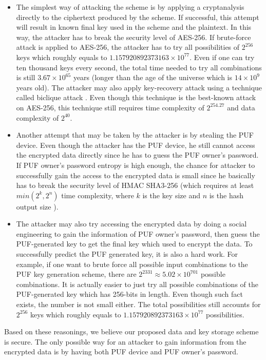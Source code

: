 \begin{itemize}
  \item The simplest way of attacking the scheme is by applying a cryptanalysis directly to the ciphertext produced by the scheme. If successful, this attempt will result in known final key used in the scheme and the plaintext.  In this way, the attacker has to break the security level of AES-256. If brute-force attack is applied to AES-256, the attacker has to try all possibilities of $2^{256}$ keys which roughly equals to $1.157920892373163 \times 10^{77}$. Even if one can try ten thousand keys every second, the total time needed to try all combinations is still $3.67 \times 10^{65}$ years (longer than the age of the universe which is $14 \times 10^9$ years old).
  The attacker may also apply key-recovery attack using a technique called biclique attack \cite{10.1007/978-3-319-19962-7_3}. Even though this technique is the best-known attack on AES-256, this technique still requires time complexity of $2^{254.27}$ and data complexity of $2^{40}$.
  \item Another attempt that may be taken by the attacker is by stealing the PUF device. Even though the attacker has the PUF device, he still cannot access the encrypted data directly since he has to guess the PUF owner's password. If PUF owner's password entropy is high enough, the chance for attacker to successfully gain the access to the encrypted data is small since he basically has to break the security level of HMAC SHA3-256 (which requires at least $min(2^k, 2^n)$ time complexity, where $k$ is the key size and $n$ is the hash output size \cite{hmac_security}).
  \item The attacker may also try accessing the encrypted data by doing a social engineering to gain the information of PUF owner's password, then guess the PUF-generated key to get the final key which used to encrypt the data. To successfully predict the PUF generated key, it is also a hard work. For example, if one want to brute force all possible input combinations to the PUF key generation scheme, there are $2^{2331} \approx 5.02 \times 10^{701}$ possible combinations. It is actually easier to just try all possible combinations of the PUF-generated key which has 256-bits in length. Even though such fact exists, the number is not small either. The total possibilities still accounts for $2^{256}$ keys which roughly equals to $1.157920892373163 \times 10^{77}$ possibilities.
\end{itemize}
Based on these reasonings, we believe our proposed data and key storage scheme is secure. The only possible way for an attacker to gain information from the encrypted data is by having both PUF device and PUF owner's password.

